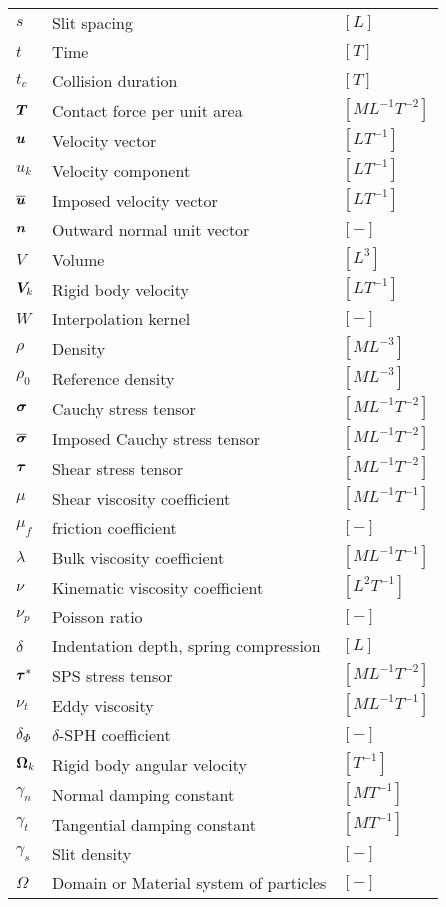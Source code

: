 \begin{longtable}{l|l|l}
$s$ & Slit spacing & $[L]$ \\
$t$ & Time & $[T]$ \\
$t_c$ & Collision duration & $[T]$ \\
$\boldsymbol{T}$ & Contact force per unit area & $[ML^{-1}T^{-2}]$ \\
$\boldsymbol{u}$ & Velocity vector & $[LT^{-1}]$ \\
${u_k}$ & Velocity component & $[LT^{-1}]$ \\
$\overline{\boldsymbol{u}}$ & Imposed velocity vector & $[LT^{-1}]$ \\
$\boldsymbol{n}$ & Outward normal unit vector & $[-]$ \\
$V$ & Volume & $[L^3]$ \\
$\boldsymbol{V}_k$ & Rigid body velocity & $[LT^{-1}]$ \\
$W$ & Interpolation kernel & $[-]$\\
$\rho$ & Density & $[ML^{-3}]$ \\
$\rho_0$ & Reference density & $[ML^{-3}]$ \\
$\boldsymbol{\sigma}$ & Cauchy stress tensor & $[ML^{-1}T^{-2}]$ \\
$\overline{\boldsymbol{\sigma}}$ & Imposed Cauchy stress tensor & $[ML^{-1}T^{-2}]$ \\
$\boldsymbol{\tau}$ & Shear stress tensor & $[ML^{-1}T^{-2}]$ \\
$\mu$ & Shear viscosity coefficient& $[ML^{-1}T^{-1}]$ \\
$\mu_f$ & friction coefficient & $[-]$ \\
$\lambda$ & Bulk viscosity coefficient & $[ML^{-1}T^{-1}]$ \\
$\nu$ & Kinematic viscosity coefficient & $[L^2T^{-1}]$ \\
$\nu_p$ & Poisson ratio & $[-]$ \\
$\delta$ & Indentation depth, spring compression & $[L]$ \\
$\boldsymbol{\tau}^*$ & SPS stress tensor & $[ML^{-1}T^{-2}]$ \\
$\nu_t$ & Eddy viscosity & $[ML^{-1}T^{-1}]$ \\
$\delta_\Phi$ & $\delta$-SPH coefficient & $[-]$ \\
$\boldsymbol{\Omega}_k$ & Rigid body angular velocity & $[T^{-1}]$ \\
$\gamma_n$ & Normal damping constant & $[MT^{-1}]$ \\
$\gamma_t$ & Tangential damping constant & $[MT^{-1}]$ \\
$\gamma_s$ & Slit density & $[-]$ \\
$\Omega$ & Domain or Material system of particles & $[-]$ \\

\end{longtable}
